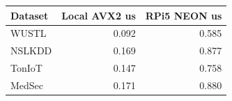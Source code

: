 \begin{tabular}{lrr}
\toprule
Dataset & Local AVX2 us & RPi5 NEON us \\
\midrule
WUSTL & 0.092 & 0.585 \\
NSLKDD & 0.169 & 0.877 \\
TonIoT & 0.147 & 0.758 \\
MedSec & 0.171 & 0.880 \\
\bottomrule
\end{tabular}
